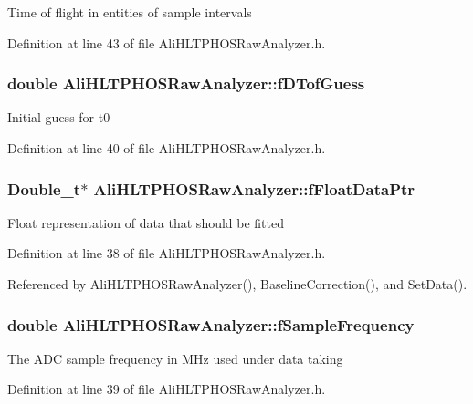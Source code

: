 Time of flight in entities of sample intervals 

Definition at line 43 of file Ali\-HLTPHOSRaw\-Analyzer.h.
\subsubsection{\setlength{\rightskip}{0pt plus 5cm}double {\bf Ali\-HLTPHOSRaw\-Analyzer::f\-DTof\-Guess}\hspace{0.3cm}{\tt  [protected]}}\label{classAliHLTPHOSRawAnalyzer_AliHLTPHOSRawAnalyzerPeakFinderp2}


Initial guess for t0 

Definition at line 40 of file Ali\-HLTPHOSRaw\-Analyzer.h.
\subsubsection{\setlength{\rightskip}{0pt plus 5cm}Double\_\-t$\ast$ {\bf Ali\-HLTPHOSRaw\-Analyzer::f\-Float\-Data\-Ptr}\hspace{0.3cm}{\tt  [protected]}}\label{classAliHLTPHOSRawAnalyzer_AliHLTPHOSRawAnalyzerPeakFinderp0}


Float representation of data that should be fitted 

Definition at line 38 of file Ali\-HLTPHOSRaw\-Analyzer.h.

Referenced by Ali\-HLTPHOSRaw\-Analyzer(), Baseline\-Correction(), and Set\-Data().
\subsubsection{\setlength{\rightskip}{0pt plus 5cm}double {\bf Ali\-HLTPHOSRaw\-Analyzer::f\-Sample\-Frequency}\hspace{0.3cm}{\tt  [protected]}}\label{classAliHLTPHOSRawAnalyzer_AliHLTPHOSRawAnalyzerPeakFinderp1}


The ADC sample frequency in MHz used under data taking 

Definition at line 39 of file Ali\-HLTPHOSRaw\-Analyzer.h.

